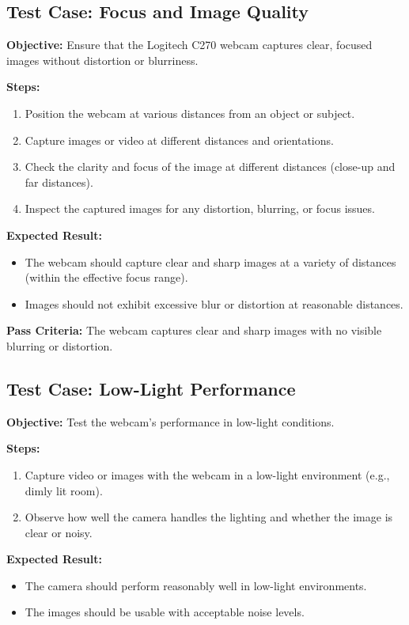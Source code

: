 \subsection{Test Case: Focus and Image Quality}
\textbf{Objective:} Ensure that the Logitech C270 webcam captures clear, focused images without distortion or blurriness.

\textbf{Steps:}
\begin{enumerate}
	\item Position the webcam at various distances from an object or subject.
	\item Capture images or video at different distances and orientations.
	\item Check the clarity and focus of the image at different distances (close-up and far distances).
	\item Inspect the captured images for any distortion, blurring, or focus issues. \cite{KRK:2020}
\end{enumerate}

\textbf{Expected Result:}
\begin{itemize}
	\item The webcam should capture clear and sharp images at a variety of distances (within the effective focus range).
	\item Images should not exhibit excessive blur or distortion at reasonable distances.
\end{itemize}

\textbf{Pass Criteria:} 
The webcam captures clear and sharp images with no visible blurring or distortion.

\subsection{Test Case: Low-Light Performance}
\textbf{Objective:} Test the webcam’s performance in low-light conditions.

\textbf{Steps:}
\begin{enumerate}
	\item Capture video or images with the webcam in a low-light environment (e.g., dimly lit room).
	\item Observe how well the camera handles the lighting and whether the image is clear or noisy.
\end{enumerate}

\textbf{Expected Result:}
\begin{itemize}
	\item The camera should perform reasonably well in low-light environments.
	\item The images should be usable with acceptable noise levels.
\end{itemize}

